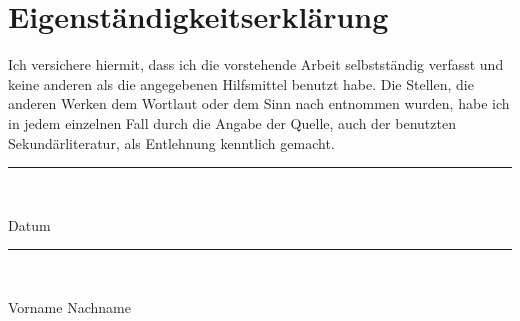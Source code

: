 \pagebreak
\section{Eigenständigkeitserklärung}

Ich versichere hiermit, dass ich die vorstehende Arbeit selbstständig verfasst und keine anderen als die angegebenen Hilfsmittel benutzt habe. Die Stellen, die anderen Werken dem Wortlaut oder dem Sinn nach entnommen wurden, habe ich in jedem einzelnen Fall durch die Angabe der Quelle, auch der benutzten Sekundärliteratur, als Entlehnung kenntlich gemacht.\hfill \break

\noindent\rule[-0.2cm]{7cm}{0.5pt}\

Datum

\rule[-0.2cm]{7cm}{0.5pt}\

Vorname Nachname

